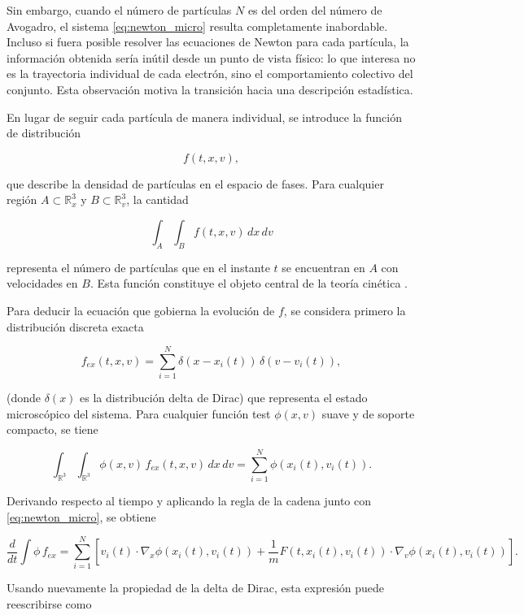 \documentclass[11pt,a4paper,twoside,pdf]{article}
\numberwithin{equation}{section}
\begin{document}
Sin embargo, cuando el número de partículas $N$ es del orden del número de
Avogadro, el sistema \eqref{eq:newton_micro} resulta completamente inabordable.
Incluso si fuera posible resolver las ecuaciones de Newton para cada partícula, la
información obtenida sería inútil desde un punto de vista físico: lo que interesa no
es la trayectoria individual de cada electrón, sino el comportamiento colectivo del
conjunto. Esta observación motiva la transición hacia una descripción estadística.

\medskip

En lugar de seguir cada partícula de manera individual, se introduce la función de
distribución


\[
f(t,x,v),
\]


que describe la densidad de partículas en el espacio de fases. Para cualquier región
$A\subset\mathbb{R}^3_x$ y $B\subset\mathbb{R}^3_v$, la cantidad


\[
\int_A\int_B f(t,x,v)\,dx\,dv
\]


representa el número de partículas que en el instante $t$ se encuentran en $A$ con
velocidades en $B$. Esta función constituye el objeto central de la teoría cinética \cite{romeroedp}.

\medskip


Para deducir la ecuación que gobierna la evolución de $f$, se considera primero la distribución discreta exacta

\begin{equation}
f_{ex}(t,x,v)=\sum_{i=1}^N \delta(x-x_i(t))\,\delta(v-v_i(t)),
\label{eq:f_ex}
\end{equation}

(donde $\delta(x)$ es la distribución delta de Dirac) que representa el estado microscópico del sistema. Para cualquier función test
$\phi(x,v)$ suave y de soporte compacto, se tiene


\[
\int_{\mathbb{R}^3}\int_{\mathbb{R}^3} \phi(x,v)\,f_{ex}(t,x,v)\,dx\,dv
= \sum_{i=1}^N \phi(x_i(t),v_i(t)).
\]



Derivando respecto al tiempo y aplicando la regla de la cadena junto con
\eqref{eq:newton_micro}, se obtiene


\[
\frac{d}{dt}\int \phi\,f_{ex}
= \sum_{i=1}^N \left[
v_i(t)\cdot\nabla_x\phi(x_i(t),v_i(t))
+ \frac{1}{m}F(t,x_i(t),v_i(t))\cdot\nabla_v\phi(x_i(t),v_i(t))
\right].
\]



Usando nuevamente la propiedad de la delta de Dirac, esta expresión puede
reescribirse como
\end{document}
